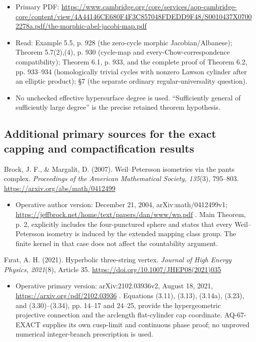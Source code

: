 \documentclass[11pt,a4paper]{article}
\providecommand{\tightlist}{\setlength{\itemsep}{0pt}\setlength{\parskip}{0pt}}
\theoremstyle{definition}\newtheorem{definition}[theorem]{Definition}
\theoremstyle{remark}\newtheorem{remark}[theorem]{Remark}
\begin{document}
\begin{itemize}
\tightlist
\item
  Primary PDF:
  \url{https://www.cambridge.org/core/services/aop-cambridge-core/content/view/4A44146CE680F4F3C857048FDEDD9F48/S0010437X07002278a.pdf/the-morphic-abel-jacobi-map.pdf}
\item
  Read: Example 5.5, p. 928 (the zero-cycle morphic Jacobian/Albanese);
  Theorem 5.7(2),(4), p. 930 (cycle-map and every-Chow-correspondence
  compatibility); Theorem 6.1, p. 933, and the complete proof of Theorem
  6.2, pp. 933--934 (homologically trivial cycles with nonzero Lawson
  cylinder after an elliptic product); §7 (the separate ordinary
  regular-universality question).
\item
  No unchecked effective hypersurface degree is used. ``Sufficiently
  general of sufficiently large degree'' is the precise retained theorem
  hypothesis.
\end{itemize}

\subsection{Additional primary sources for the exact capping and
compactification
results}\label{additional-primary-sources-for-the-exact-capping-and-compactification-results}

Brock, J. F., \& Margalit, D. (2007). Weil--Petersson isometries via the
pants complex. \emph{Proceedings of the American Mathematical Society,
135}(3), 795--803. \url{https://arxiv.org/abs/math/0412499}

\begin{itemize}
\tightlist
\item
  Operative author version: December 21, 2004, arXiv:math/0412499v1;
  \url{https://jeffbrock.net/home/text/papers/dan/www/wp.pdf} . Main
  Theorem, p. 2, explicitly includes the four-punctured sphere and
  states that every Weil--Petersson isometry is induced by the extended
  mapping class group. The finite kernel in that case does not affect
  the countability argument.
\end{itemize}

Fırat, A. H. (2021). Hyperbolic three-string vertex. \emph{Journal of
High Energy Physics, 2021}(8), Article 35.
\url{https://doi.org/10.1007/JHEP08(2021)035}

\begin{itemize}
\tightlist
\item
  Operative primary version: arXiv:2102.03936v2, August 18, 2021,
  \url{https://arxiv.org/pdf/2102.03936} . Equations (3.11), (3.13),
  (3.14a), (3.23), and (3.30)--(3.34), pp. 14--17 and 24--25, provide
  the hypergeometric projective connection and the arclength
  flat-cylinder cap coordinate. AQ-67-EXACT supplies its own cusp-limit
  and continuous phase proof; no unproved numerical integer-branch
  prescription is used.
\end{itemize}
\end{document}
